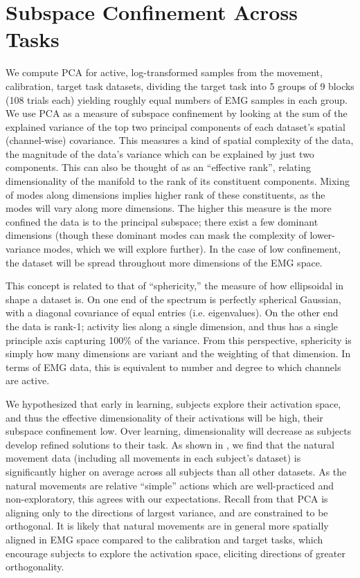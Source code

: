 \documentclass[../main.tex]{subfiles}
\begin{document}
\section{Subspace Confinement Across Tasks}

We compute PCA for active, log-transformed samples from the movement, calibration, target task datasets, dividing the target task into 5 groups of 9 blocks (108 trials each) yielding roughly equal numbers of EMG samples in each group. We use PCA as a measure of subspace confinement by looking at the sum of the explained variance of the top two principal components of each dataset's spatial (channel-wise) covariance. This measures a kind of spatial complexity of the data, the magnitude of the data's variance which can be explained by just two components. This can also be thought of as an ``effective rank'', relating dimensionality of the manifold to the rank of its constituent components. Mixing of modes along dimensions implies higher rank of these constituents, as the modes will vary along more dimensions. The higher this measure is the more confined the data is to the principal subspace; there exist a few dominant dimensions (though these dominant modes can mask the complexity of lower-variance modes, which we will explore further). In the case of low confinement, the dataset will be spread throughout more dimensions of the EMG space.

This concept is related to that of ``sphericity,'' the measure of how ellipsoidal in shape a dataset is. On one end of the spectrum is perfectly spherical Gaussian, with a diagonal covariance of equal entries (i.e. eigenvalues). On the other end the data is rank-1; activity lies along a single dimension, and thus has a single principle axis capturing 100\% of the variance. From this perspective, sphericity is simply how many dimensions are variant and the weighting of that dimension. In terms of EMG data, this is equivalent to number and degree to which channels are active.

We hypothesized that early in learning, subjects explore their activation space, and thus the effective dimensionality of their activations will be high, their subspace confinement low. Over learning, dimensionality will decrease as subjects develop refined solutions to their task. As shown in , we find that the natural movement data (including all movements in each subject's dataset) is significantly higher on average across all subjects than all other datasets. As the natural movements are relative ``simple'' actions which are well-practiced and non-exploratory, this agrees with our expectations. Recall from  that PCA is aligning only to the directions of largest variance, and are constrained to be orthogonal. It is likely that natural movements are in general more spatially aligned in EMG space compared to the calibration and target tasks, which encourage subjects to explore the activation space, eliciting directions of greater orthogonality.
\end{document}
